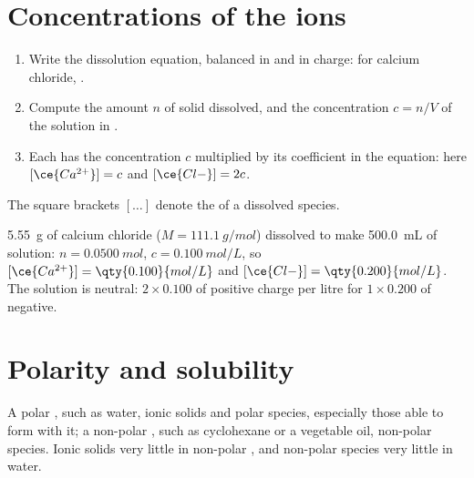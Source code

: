 \section{Concentrations of the ions}

\begin{method}\label{met:g11:dissolution:ions}
\begin{enumerate}
  \item Write the dissolution equation, balanced in  and in charge:
        for calcium chloride, .
  \item Compute the amount $n$ of solid dissolved, and the concentration
        $c = n / V$ of the solution in .
  \item Each  has the concentration $c$ multiplied by its coefficient
        in the equation: here $[\ce{Ca^{2+}}] = c$ and
        $[\ce{Cl-}] = 2c$.
\end{enumerate}
The square brackets $[\ldots]$ denote the  of a
dissolved species.
\end{method}

\begin{example}\label{ex:g11:dissolution:cacl2}
\qty{5.55}{g} of calcium chloride ($M = \qty{111.1}{g/mol}$) dissolved
to make \qty{500.0}{mL} of solution: $n = \qty{0.0500}{mol}$,
$c = \qty{0.100}{mol/L}$, so $[\ce{Ca^{2+}}] = \qty{0.100}{mol/L}$ and
$[\ce{Cl-}] = \qty{0.200}{mol/L}$. The solution is neutral: $2 \times
0.100$ of positive charge per litre for $1 \times 0.200$ of negative.
\end{example}

\section{Polarity and solubility}

\begin{proposition}\label{prop:g11:dissolution:like}
A polar , such as water,  ionic solids and polar
species, especially those able to form  with it; a
non-polar , such as cyclohexane or a vegetable oil, 
non-polar species. Ionic solids  very little in non-polar
, and non-polar species very little in water.
\end{proposition}

